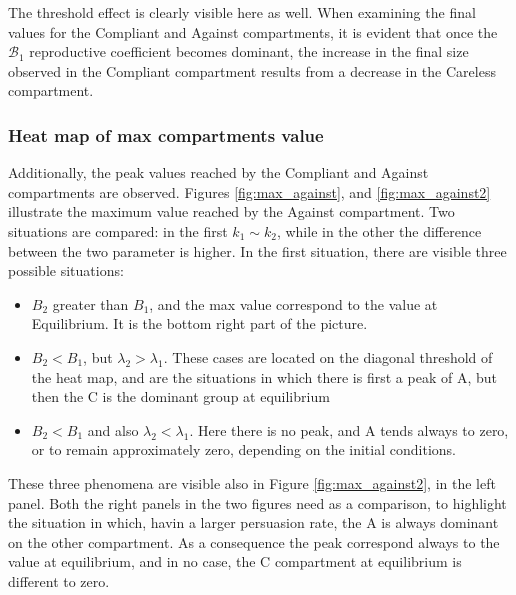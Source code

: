 The threshold effect is clearly visible here as well. When examining the final values for the Compliant and Against compartments, it is evident that once the $\mathcal{B}_1$ reproductive coefficient becomes dominant, the increase in the final size observed in the Compliant compartment results from a decrease in the Careless compartment.

\subsubsection{Heat map of max compartments value}
Additionally, the peak values reached by the Compliant and Against compartments are observed. Figures \ref{fig:max_against}, and \ref{fig:max_against2} illustrate the maximum value reached by the Against compartment.
Two situations are compared: in the first $k_1 \sim k_2$, while in the other the difference between the two parameter is higher. In the first situation, there are visible three possible situations:
\begin{itemize}
	\item $B_2 $ greater than $B_1$, and the max value correspond to the value at Equilibrium. It is the bottom right part of the picture.
	\item $B_2 < B_1$, but $\lambda_2 > \lambda_1$. These cases are located on the diagonal threshold of the heat map, and are the situations in which there is first a peak of A, but then the C is the dominant group at equilibrium
	\item $B_2 < B_1$ and also $\lambda_2 < \lambda_1$. Here there is no peak, and A tends always to zero, or to remain approximately zero, depending on the initial conditions.
\end{itemize}
These three phenomena are visible also in Figure \ref{fig:max_against2}, in the left panel. Both the right panels in the two figures need as a comparison, to highlight the situation in which, havin a larger persuasion rate, the A is always dominant on the other compartment. As a consequence the peak correspond always to the value at equilibrium, and in no case, the C compartment at equilibrium is different to zero. 
